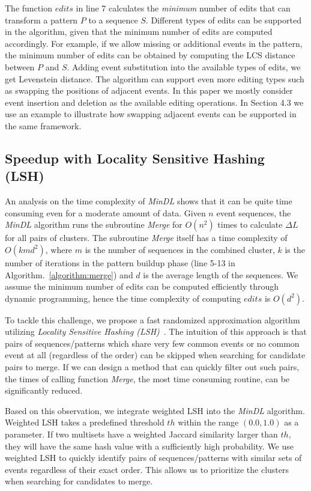 The function $edits$ in line 7 calculates the \textit{minimum} number of edits that can transform a pattern $P$ to a sequence $S$. Different types of edits can be supported in the algorithm, given that the minimum number of edits are computed accordingly. For example, if we allow missing or additional events in the pattern, the minimum number of edits can be obtained by computing the LCS distance between $P$ and $S$. Adding event substitution into the available types of edits, we get Levenstein distance. The algorithm can support even more editing types such as swapping the positions of adjacent events. In this paper we mostly consider event insertion and deletion as the available editing operations. In Section 4.3 we use an example to illustrate how swapping adjacent events can be supported in the same framework.

\subsection{Speedup with Locality Sensitive Hashing (LSH)}

An analysis on the time complexity of \textit{MinDL} shows that it can be quite time consuming even for a moderate amount of data. Given $n$ event sequences, the \textit{MinDL} algorithm runs the subroutine \textit{Merge} for $O(n^2)$ times to calculate $\Delta L$ for all pairs of clusters. The subroutine \textit{Merge} itself has a time complexity of $O(kmd^2)$, where $m$ is the number of sequences in the combined cluster, $k$ is the number of iterations in the pattern buildup phase (line 5-13 in Algorithm.~\ref{algorithm:merge}) and $d$ is the average length of the sequences. We assume the minimum number of edits can be computed efficiently through dynamic programming, hence the time complexity of computing $edits$ is $O(d^2)$.

To tackle this challenge, we propose a fast randomized approximation algorithm utilizing \textit{Locality Sensitive Hashing (LSH)}~\cite{leskovec2014mining}. The intuition of this approach is that pairs of sequences/patterns which share very few common events or no common event at all (regardless of the order) can be skipped when searching for candidate pairs to merge. If we can design a method that can quickly filter out such pairs, the times of calling function \textit{Merge}, the most time consuming routine, can be significantly reduced.

Based on this observation, we integrate weighted LSH \cite{ioffe2010improved} into the \textit{MinDL} algorithm. Weighted LSH takes a predefined threshold $th$ within the range $(0.0, 1.0)$ as a parameter. If two multisets have a weighted Jaccard similarity larger than $th$, they will have the same hash value with a sufficiently high probability. We use weighted LSH to quickly identify pairs of sequences/patterns with similar sets of events regardless of their exact order. This allows us to prioritize the clusters when searching for candidates to merge.

